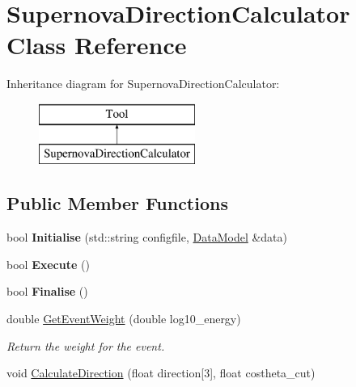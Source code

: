 \hypertarget{classSupernovaDirectionCalculator}{\section{Supernova\-Direction\-Calculator Class Reference}
\label{classSupernovaDirectionCalculator}
}
Inheritance diagram for Supernova\-Direction\-Calculator\-:\begin{figure}[H]
\begin{center}
\leavevmode
\includegraphics[height=2.000000cm]{classSupernovaDirectionCalculator}
\end{center}
\end{figure}
\subsection*{Public Member Functions}
\begin{DoxyCompactItemize}
\item 
\hypertarget{classSupernovaDirectionCalculator_aed7b11a1833767006bffac07ad3cced7}{bool {\bfseries Initialise} (std\-::string configfile, \hyperlink{classDataModel}{Data\-Model} \&data)}\label{classSupernovaDirectionCalculator_aed7b11a1833767006bffac07ad3cced7}

\item 
\hypertarget{classSupernovaDirectionCalculator_a4762604ba2382d21f239d6e71a97a174}{bool {\bfseries Execute} ()}\label{classSupernovaDirectionCalculator_a4762604ba2382d21f239d6e71a97a174}

\item 
\hypertarget{classSupernovaDirectionCalculator_a467b25370dad440342bf49be3eabd73b}{bool {\bfseries Finalise} ()}\label{classSupernovaDirectionCalculator_a467b25370dad440342bf49be3eabd73b}

\item 
\hypertarget{classSupernovaDirectionCalculator_a70ead4a641b1837728469307676330ba}{double \hyperlink{classSupernovaDirectionCalculator_a70ead4a641b1837728469307676330ba}{Get\-Event\-Weight} (double log10\-\_\-energy)}\label{classSupernovaDirectionCalculator_a70ead4a641b1837728469307676330ba}

\begin{DoxyCompactList}\small\item\em Return the weight for the event. \end{DoxyCompactList}\item 
void \hyperlink{classSupernovaDirectionCalculator_a20f7efcc68e303a9d049395663c08a03}{Calculate\-Direction} (float direction\mbox{[}3\mbox{]}, float costheta\-\_\-cut)
\end{DoxyCompactItemize}



